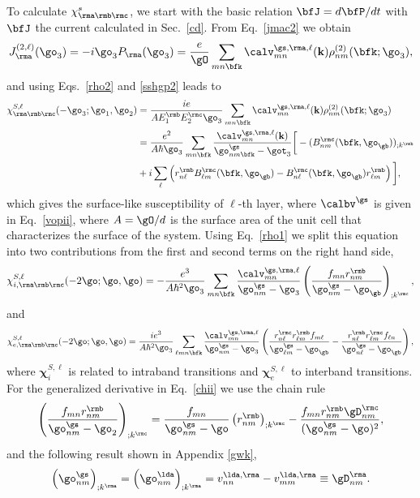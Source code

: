 \documentclass[floatfix,prb,aps,superscriptaddress,11pt,preprint,letterpaper]{revtex4}
\begin{document}
To calculate $\chi_{\rma\rmb\rmc}^s$,
we start with the basic relation $\bfJ=d\bfP/dt$ 
with $\bfJ$ the current calculated in Sec.~\ref{cd}. From Eq.~\eqref{jmac2} 
we obtain
\begin{equation}\label{Pjikn}
J_{\rma}^{(2,\ell)}(\go_3)=-i\go_3P_{\rma}(\go_3)
=\frac{e}{\gO}
\sum_{mn\bfk}
\calv^{\gs,\rma,\ell}_{mn}(\mathbf{k})
\rho^{(2)}_{nm}(\bfk;\go_3)
,
\end{equation}
and using Eqs.~\eqref{rho2} and \eqref{sshgp2} leads to
\begin{align}\label{Pjikn2}
\chi^{S,\ell}_{\rma\rmb\rmc}(-\go_3;\go_1,\go_2)
&=
\frac{ie}{A E^{\rmb}_1E^{\rmc}_2 \go_3}
\sum_{mn\bfk}
\calv^{\gs,\rma,\ell}_{mn}(\mathbf{k})
\rho^{(2)}_{nm}(\bfk;\go_3)
\nonumber \\
&=
\frac{e^2}{A\hbar\go_3}
\sum_{mn\bfk}
\frac{\calv^{\gs,\rma,\ell}_{mn}(\mathbf{k})}
{\go^\gs_{nm\bfk}-\got_3}
\bigg[
-(B_{nm}^{\rmc}(\bfk,\go_\gb))_{;k^{\rmb}}
\nonumber \\
&
+i\sum_\ell\left(r_{n\ell}^{\rmb}B_{\ell m}^{\rmc}(\bfk,\go_\gb) -
  B_{n\ell}^{\rmc}(\bfk,\go_\gb) 
  r_{\ell m}^{\rmb}\right)
\bigg]
,
\end{align}
which gives the surface-like susceptibility of $\ell$-th layer, where 
$\calbv^\gs$ is given in Eq.~\eqref{vopii},
where $A=\gO/d$ is the surface area of the unit
cell that characterizes the surface of the system.
Using Eq.~\eqref{rho1} we
split this equation into
two contributions from the first and second terms on the right hand side,
\begin{equation}\label{chii}
\chi_{i,\rma\rmb\rmc}^{S,\ell}
(-2\go;\go,\go)
=-\frac{e^3}{A\hbar^2\go_3}\sum_{mn\bfk}
\frac{\calv_{mn}^{\gs,\rma,\ell}}{\go^\gs_{nm}-\go_3}
\left(\frac{f_{mn}r_{nm}^{\rmb}}{\go^\gs_{nm}-\go_\gb}\right)_{;k^{\rmc}},
\end{equation} 
and 
\begin{equation}\label{chie}
\chi_{e,\rma\rmb\rmc}^{S,\ell}
(-2\go;\go,\go)
=\frac{ie^3}{A\hbar^2\go_3}\sum_{\ell mn\bfk}
\frac{\calv_{mn}^{\gs,\rma,\ell}}{\go^\gs_{nm}-\go_3}
\left(
\frac{r_{n\ell}^{\rmc} r_{\ell m}^{\rmb} 
f_{m\ell}}{\go^\gs_{\ell m}-\go_\gb}
-\frac{r_{n\ell}^{\rmb} r_{\ell m}^{\rmc} 
f_{\ell n}}{\go^\gs_{n \ell}-\go_\gb}
\right),
\end{equation} 
where $\boldsymbol{\chi}^{S,\ell}_i$
 is related to intraband transitions and
$\boldsymbol{\chi}^{S,\ell}_e$
to interband transitions.
For the generalized derivative in Eq.~\eqref{chii} we use the chain rule 
\begin{equation}\label{gene2}
\left(\frac{f_{mn}r_{nm}^{\rmb}}{\go^\gs_{nm}-\go_2}\right)_{;k^{\rmc}}=
\frac{f_{mn}}{\go^\gs_{nm}-\go}\left(r_{nm}^\rmb\right)_{;k^{\rmc}}
-\frac{f_{mn}r_{nm}^{\rmb}\gD_{nm}^\rmc}{(\go^\gs_{nm}-\go)^2}
,
\end{equation}
and the following result
shown in Appendix \ref{gwk},
\begin{align}\label{eli.13}
\left(\go^\gs_{nm}\right)_{;k^{\rma}}
=
\left(\go^\lda_{nm}\right)_{;k^{\rma}}
= 
v_{nn}^{\lda,\rma}-v_{mm}^{\lda,\rma}\equiv\gD_{nm}^{\rma}
.
\end{align} 
\end{document}
